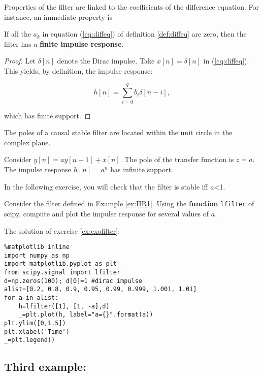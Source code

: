 Properties of the filter are linked to the coefficients of the
difference equation. For instance, an immediate property is

\begin{property}
If all the $a_k$ in equation (\ref{eq:diffeq}) of definition
\ref{def:diffeq} are zero, then the filter has a \textbf{finite impulse
response}.
\end{property}

\begin{proof}
Let $\delta[n]$ denote the Dirac impulse. Take $x[n]=\delta[n]$ in
(\ref{eq:diffeq}). This yields, by definition, the impulse response:

\begin{equation}
\label{eq:fir}
h[n]= \sum_{i=0}^q b_i \delta[n-i],
\end{equation}

which has finite support.
\end{proof}

\begin{theorem}
The poles of a causal stable filter are located within the unit circle
in the complex plane.
\end{theorem}

\begin{example}
\label{ex:IIR1} Consider $y[n]= a y[n-1] +  x[n]$. The pole of the
transfer function is $z=a$. The impulse response $h[n]=a^n$ has infinite
support.
\end{example}

In the following exercise, you will check that the filter is stable iff
$a$\textless{}1.

\begin{exercise}
\label{ex:exofilter} Consider the filter defined in Example
\ref{ex:IIR1}. Using the \textbf{function} \texttt{lfilter} of scipy,
compute and plot the impulse response for several values of $a$.
\end{exercise}

    The solution of exercise \ref{ex:exofilter}:
\begin{lstlisting}
%matplotlib inline
import numpy as np
import matplotlib.pyplot as plt 
from scipy.signal import lfilter
d=np.zeros(100); d[0]=1 #dirac impulse
alist=[0.2, 0.8, 0.9, 0.95, 0.99, 0.999, 1.001, 1.01]
for a in alist:
    h=lfilter([1], [1, -a],d)
    _=plt.plot(h, label="a={}".format(a))
plt.ylim([0,1.5])
plt.xlabel('Time')
_=plt.legend()
\end{lstlisting}
    \subsection{Third example:}\label{third-example}

